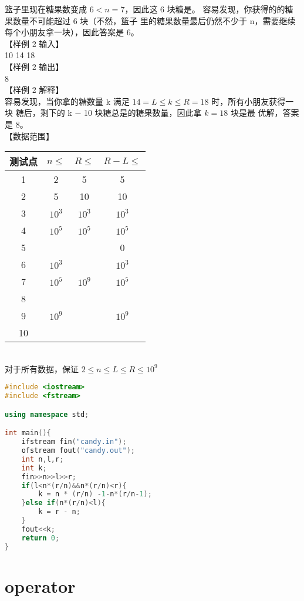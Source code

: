 \documentclass[12pt,twiside,a4paper]{ctexbook}
\numberwithin{chapter}{part}
\begin{document}
篮子里现在糖果数变成 $6 < n = 7$，因此这 6 块糖是。
容易发现，你获得的的糖果数量不可能超过 6 块（不然，篮子
里的糖果数量最后仍然不少于 n，需要继续每个小朋友拿一块），因此答案是 6。\\
【样例 2 输入】\\
10 14 18\\
【样例 2 输出】\\
8\\
【样例 2 解释】\\
容易发现，当你拿的糖数量 k 满足 $14 = L \leq k \leq R = 18$ 时，所有小朋友获得一块
糖后，剩下的 k − 10 块糖总是的糖果数量，因此拿 $k = 18$ 块是最
优解，答案是 8。\\
【数据范围】\\
\begin{tabular}{|c|c|c|c|}
  \hline
  测试点 &  $n\leq$ & $R\leq$ & $R-L\leq$\\
  \hline
  1 & 2 & 5 & 5\\
  \hline
  2 & 5 & 10 & 10\\
  \hline
  3 & $10^3$ & $10^3$ & $10^3$\\
  \hline
  4 & $10^5$ & $10^5$ & $10^5$\\
  \hline
  5 & & & 0\\
  \cline{1-1}
  \cline{4-1}
  6 & $10^3$ & & $10^3$\\
  \cline{1-1}
  \cline{2-1}
  \cline{4-1}
  7 & $10^5$ & $10^9$ & $10^5$\\
  \cline{1-1}
  \cline{2-1}
  \cline{4-1}
  8 & & & \\
  \cline{1-1}
  9 & $10^9$ & & $10^{9}$\\
  \cline{1-1}
  10 & & &\\
  \hline
\end{tabular}\\
对于所有数据，保证 $2 \leq n \leq L \leq R \leq 10^9$
\begin{lstlisting}[language=C++]
#include <iostream>
#include <fstream>

using namespace std;

int main(){
	ifstream fin("candy.in");
	ofstream fout("candy.out");
	int n,l,r;
	int k;
	fin>>n>>l>>r;
	if(l<n*(r/n)&&n*(r/n)<r){
		k = n * (r/n) -1-n*(r/n-1);
	}else if(n*(r/n)<l){
		k = r - n;
	}
	fout<<k;
	return 0;
}
\end{lstlisting}

\chapter{operator}
\end{document}
